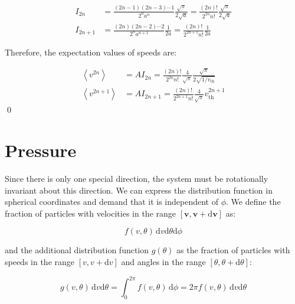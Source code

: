 \documentclass[12pt]{article}
\begin{document}
\begin{equation}
    \begin{split}
        I_{2n} &= \frac{(2n-1)(2n-3)\cdots 1}{2^{n} a^{n}} \frac{\sqrt{\pi}}{2\sqrt{a}} = \frac{(2n)!}{2^{2n} n!} \frac{\sqrt{\pi}}{2\sqrt{a}} \\
        I_{2n+1} &= \frac{(2n)(2n-2)\cdots 2}{2^{n} a^{n+1}} \frac{1}{2a} = \frac{(2n)!}{2^{2n+1} n!} \frac{1}{2a}
    \end{split}
\end{equation}

Therefore, the expectation values of speeds are:

\begin{equation}
    \begin{split}
        \left\langle v^{2n} \right\rangle &= A I_{2n} = \frac{(2n)!}{2^{2n} n!} \frac{4}{\sqrt{\pi}} \frac{\sqrt{\pi}}{2\sqrt{1/v_{\text{th}}}} \\
        \left\langle v^{2n+1} \right\rangle &= A I_{2n+1} = \frac{(2n)!}{2^{2n+1} n!} \frac{4}{\sqrt{\pi}} v_{\text{th}}^{2n+1}
    \end{split}
\end{equation}
\qed


\pagebreak
\section*{Pressure}



Since there is only one special direction, the system must be rotationally invariant about this direction. We can express the distribution function in spherical coordinates and demand that it is independent of $\phi$. We define the fraction of particles with velocities in the range $[\mathbf{v}, \mathbf{v} + \mathrm{d}\mathbf{v}]$ as:

\begin{equation}
    f(v, \theta) \, \mathrm{d}v \mathrm{d}\theta \mathrm{d}\phi
\end{equation}

and the additional distribution function $g(\theta)$ as the fraction of particles with speeds in the range $[v, v + \mathrm{d}v]$ and angles in the range $[\theta, \theta + \mathrm{d}\theta]$:

\begin{equation}
    g(v, \theta) \, \mathrm{d}v \mathrm{d}\theta = \int_{0}^{2\pi} f(v, \theta) \, \mathrm{d}\phi = 2\pi f(v, \theta) \, \mathrm{d}v \mathrm{d}\theta
\end{equation}
\end{document}
